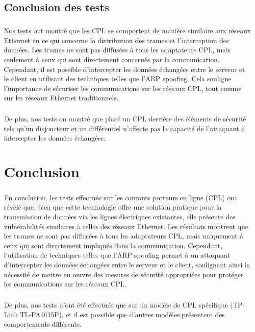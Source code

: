 \documentclass[a4paper,twocolumn]{report}
\begin{document}
\section{Conclusion des tests}
\paragraph{}Nos tests ont montré que les CPL se comportent de manière similaire
aux réseaux Ethernet en ce qui concerne la distribution des trames et l'interception des données.
Les trames ne sont pas diffusées à tous les adaptateurs CPL, mais seulement
à ceux qui sont directement concernés par la communication. Cependant,
il est possible d'intercepter les données échangées entre le serveur et le client
en utilisant des techniques telles que l'ARP spoofing. Cela souligne l'importance de
sécuriser les communications sur les réseaux CPL, tout comme sur les réseaux Ethernet traditionnels.
\paragraph{}De plus, nos tests on montré que placé un CPL derrière des éléments de sécurité tels qu'un disjoncteur et un différentiel n'affecte pas la capacité de l'attaquant à intercepter les données échangées.

\chapter{Conclusion}

\paragraph{}En conclusion, les tests effectués sur les courants porteurs
en ligne (CPL) ont révélé que, bien que cette technologie offre une solution
pratique pour la transmission de données via les lignes électriques existantes,
elle présente des vulnérabilités similaires à celles des réseaux Ethernet.
Les résultats montrent que les trames ne sont pas diffusées à tous les adaptateurs CPL,
mais uniquement à ceux qui sont directement impliqués dans la communication. Cependant,
l'utilisation de techniques telles que l'ARP spoofing permet à un attaquant d'intercepter
les données échangées entre le serveur et le client, soulignant ainsi la nécessité de
mettre en œuvre des mesures de sécurité appropriées pour protéger les communications sur les réseaux CPL.
\paragraph{}De plus, nos tests n'ont été effectués que sur un modèle de CPL spécifique
(TP-Link TL-PA4015P), et il est possible que d'autres modèles présentent des comportements différents.
\end{document}
